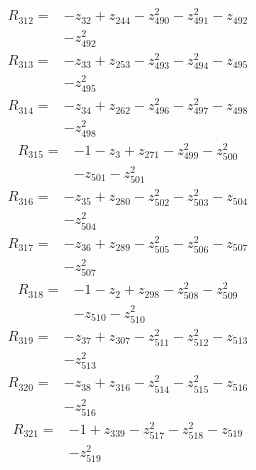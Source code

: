 \begin{align*}
R_{312}={}&-z_{32}+z_{244}-z_{490}^{2}-z_{491}^{2}-z_{492}\\
&-z_{492}^{2}
\end{align*}
\begin{align*}
R_{313}={}&-z_{33}+z_{253}-z_{493}^{2}-z_{494}^{2}-z_{495}\\
&-z_{495}^{2}
\end{align*}
\begin{align*}
R_{314}={}&-z_{34}+z_{262}-z_{496}^{2}-z_{497}^{2}-z_{498}\\
&-z_{498}^{2}
\end{align*}
\begin{align*}
R_{315}={}&-1-z_{3}+z_{271}-z_{499}^{2}-z_{500}^{2}\\
&-z_{501}-z_{501}^{2}
\end{align*}
\begin{align*}
R_{316}={}&-z_{35}+z_{280}-z_{502}^{2}-z_{503}^{2}-z_{504}\\
&-z_{504}^{2}
\end{align*}
\begin{align*}
R_{317}={}&-z_{36}+z_{289}-z_{505}^{2}-z_{506}^{2}-z_{507}\\
&-z_{507}^{2}
\end{align*}
\begin{align*}
R_{318}={}&-1-z_{2}+z_{298}-z_{508}^{2}-z_{509}^{2}\\
&-z_{510}-z_{510}^{2}
\end{align*}
\begin{align*}
R_{319}={}&-z_{37}+z_{307}-z_{511}^{2}-z_{512}^{2}-z_{513}\\
&-z_{513}^{2}
\end{align*}
\begin{align*}
R_{320}={}&-z_{38}+z_{316}-z_{514}^{2}-z_{515}^{2}-z_{516}\\
&-z_{516}^{2}
\end{align*}
\begin{align*}
R_{321}={}&-1+z_{339}-z_{517}^{2}-z_{518}^{2}-z_{519}\\
&-z_{519}^{2}
\end{align*}
